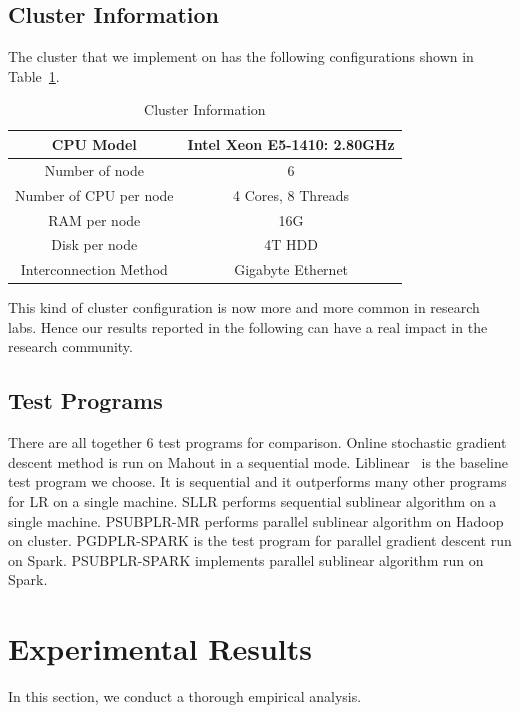 \documentclass[10pt, conference, compsocconf]{IEEEtran}
\begin{document}
\subsection{Cluster Information}
The cluster that we implement on has the following configurations shown in Table~\ref{tab:table2}.
\begin{table}[h]
\centering
\caption{Cluster Information}\label{tab:table2}\vspace{-0.3cm}
\begin{tabular}{|c|c|}
\hline
    CPU Model & Intel Xeon E5-1410: 2.80GHz \\
\hline
    Number of node & 6 \\
\hline
    Number of CPU per node & 4 Cores, 8 Threads \\
\hline
    RAM per node & 16G \\
\hline
    Disk per node & 4T HDD\\
\hline
    Interconnection Method & Gigabyte Ethernet  \\
\hline
\end{tabular}
\end{table}
This kind of cluster configuration is now more and more common in research labs. Hence our results reported in the following can have a real impact in the research community.

\subsection{Test Programs}
There are all together 6 test programs for comparison.
Online stochastic gradient descent method is run on Mahout in a sequential mode.
Liblinear~\cite{fan2008liblinear} is the baseline test program we choose. It is sequential and it outperforms many other programs for LR on a single machine.
SLLR performs sequential sublinear algorithm on a single machine.
PSUBPLR-MR performs parallel sublinear algorithm on Hadoop on cluster.
PGDPLR-SPARK is the test program for parallel gradient descent run on Spark.
PSUBPLR-SPARK implements parallel sublinear algorithm run on Spark.

\section{Experimental Results} \label{sec:experiment}
In this section, we conduct a thorough empirical analysis.
\end{document}
